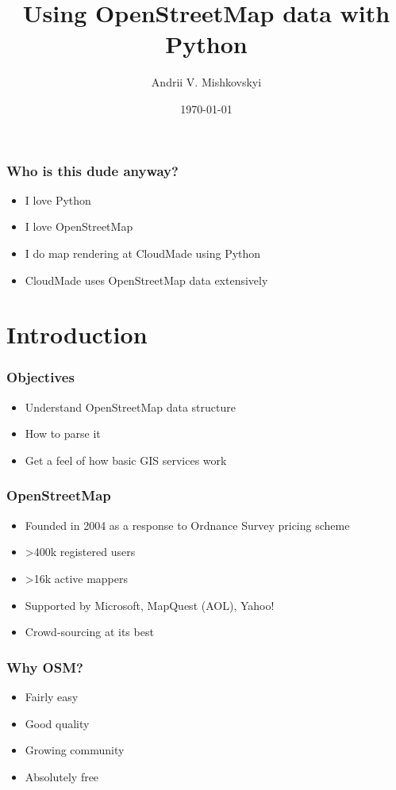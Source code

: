 \documentclass[14pt]{beamer}
\title{Using OpenStreetMap data with Python}
\author{Andrii V. Mishkovskyi}
\date{\today}
\begin{document}
\begin{frame}
  \titlepage
\end{frame}

\begin{frame}
  \frametitle{Who is this dude anyway?}
  \begin{itemize}
  \item I love Python
  \item I love OpenStreetMap
  \item I do map rendering at CloudMade using Python
  \item CloudMade uses OpenStreetMap data extensively
  \end{itemize}
\end{frame}

\section*{Introduction}

\begin{frame}
  \frametitle{Objectives}
  \begin{itemize}
  \item Understand OpenStreetMap data structure
  \item How to parse it
  \item Get a feel of how basic GIS services work
  \end{itemize}
\end{frame}

\begin{frame}
  \frametitle{OpenStreetMap}
  \begin{itemize}
  \item Founded in 2004 as a response to Ordnance
    Survey pricing scheme
  \item >400k registered users
  \item >16k active mappers
  \item Supported by Microsoft, MapQuest (AOL), Yahoo!
  \item Crowd-sourcing at its best
  \end{itemize}
\end{frame}

\begin{frame}
  \frametitle{Why OSM?}
  \begin{itemize}
  \item Fairly easy
  \item Good quality
  \item Growing community
  \item Absolutely free
  \end{itemize}
\end{frame}
\end{document}
